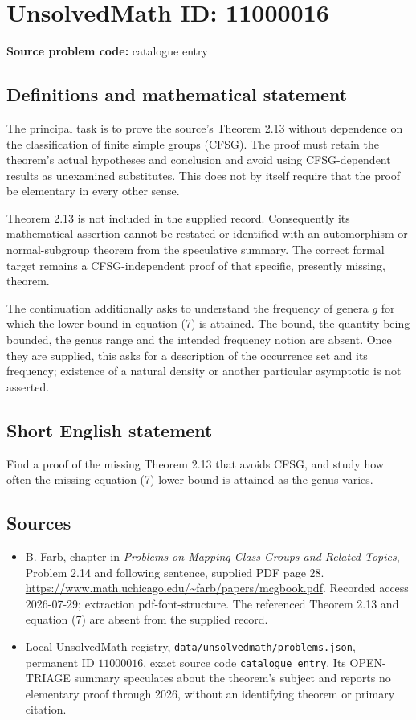 \documentclass[11pt]{article}
\begin{document}
\section*{UnsolvedMath ID: 11000016}
\textbf{Source problem code:} catalogue entry
\subsection{Definitions and mathematical statement}
The principal task is to prove the source's Theorem 2.13 without dependence on the classification of finite simple groups (CFSG). The proof must retain the theorem's actual hypotheses and conclusion and avoid using CFSG-dependent results as unexamined substitutes. This does not by itself require that the proof be elementary in every other sense.

Theorem 2.13 is not included in the supplied record. Consequently its mathematical assertion cannot be restated or identified with an automorphism or normal-subgroup theorem from the speculative summary. The correct formal target remains a CFSG-independent proof of that specific, presently missing, theorem.

The continuation additionally asks to understand the frequency of genera \(g\) for which the lower bound in equation (7) is attained. The bound, the quantity being bounded, the genus range and the intended frequency notion are absent. Once they are supplied, this asks for a description of the occurrence set and its frequency; existence of a natural density or another particular asymptotic is not asserted.
\subsection{Short English statement}
Find a proof of the missing Theorem 2.13 that avoids CFSG, and study how often the missing equation (7) lower bound is attained as the genus varies.
\subsection{Sources}
\begin{itemize}
\item B. Farb, chapter in \emph{Problems on Mapping Class Groups and Related Topics}, Problem 2.14 and following sentence, supplied PDF page 28. \url{https://www.math.uchicago.edu/~farb/papers/mcgbook.pdf}. Recorded access 2026-07-29; extraction pdf-font-structure. The referenced Theorem 2.13 and equation (7) are absent from the supplied record.
\item Local UnsolvedMath registry, \texttt{data/unsolvedmath/problems.json}, permanent ID \(11000016\), exact source code \texttt{catalogue entry}. Its OPEN-TRIAGE summary speculates about the theorem's subject and reports no elementary proof through 2026, without an identifying theorem or primary citation.
\end{itemize}
\end{document}
